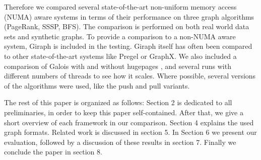 Therefore we compared several state-of-the-art non-uniform memory access (NUMA) aware systems in terms of their performance on three graph algorithms (PageRank, SSSP, BFS).
The comparison is performed on both real world data sets and synthetic graphs.
To provide a comparison to a non-NUMA aware system, Giraph is included in the testing.
Giraph itself has often been compared to other state-of-the-art systems like Pregel or GraphX.
We also included a comparison of Galois with and without hugepages \cite{hugepages}, and several runs with different numbers of threads to see how it scales.
Where possible, several versions of the algorithms were used, like the push and pull variants.

The rest of this paper is organized as follows:
Section 2 is dedicated to all preliminaries, in order to keep this paper self-contained.
After that, we give a short overview of each framework in our comparison.
Section 4 explains the used graph formats.
Related work is discussed in section 5.
In Section 6 we present our evaluation, followed by a discussion of these results in section 7. Finally we conclude the paper in section 8.
